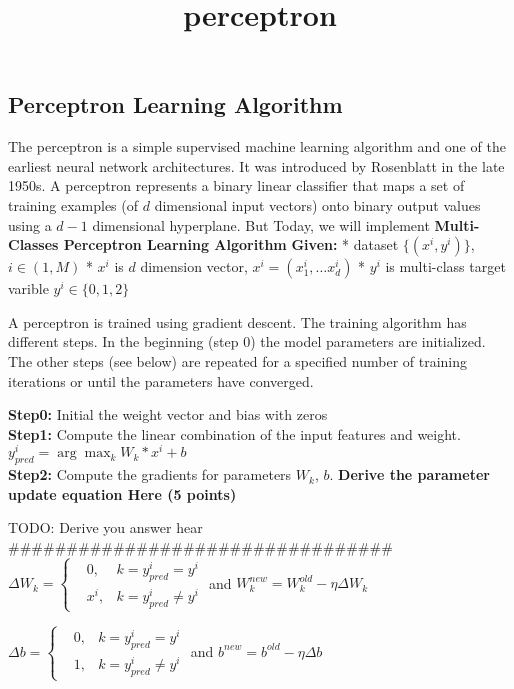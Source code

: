 \documentclass[11pt]{article}
\title{perceptron}
\begin{document}
    
    \maketitle
    
    

    
    \hypertarget{perceptron-learning-algorithm}{%
\subsection{Perceptron Learning
Algorithm}\label{perceptron-learning-algorithm}}

The perceptron is a simple supervised machine learning algorithm and one
of the earliest neural network architectures. It was introduced by
Rosenblatt in the late 1950s. A perceptron represents a binary linear
classifier that maps a set of training examples (of \(d\) dimensional
input vectors) onto binary output values using a \(d-1\) dimensional
hyperplane. But Today, we will implement \textbf{Multi-Classes
Perceptron Learning Algorithm} \textbf{Given:} * dataset
\(\{(x^i, y^i)\}\), \(i \in (1, M)\) * \(x^i\) is \(d\) dimension
vector, \(x^i = (x^i_1, \dots x^i_d)\) * \(y^i\) is multi-class target
varible \(y^i \in \{0,1,2\}\)

A perceptron is trained using gradient descent. The training algorithm
has different steps. In the beginning (step 0) the model parameters are
initialized. The other steps (see below) are repeated for a specified
number of training iterations or until the parameters have converged.

\textbf{Step0:} Initial the weight vector and bias with zeros\\
\textbf{Step1:} Compute the linear combination of the input features and
weight. \(y^i_{pred} = \arg\max_k W_k*x^i + b\)\\
\textbf{Step2:} Compute the gradients for parameters \(W_k\), \(b\).
\textbf{Derive the parameter update equation Here (5 points)}

TODO: Derive you answer hear
\#\#\#\#\#\#\#\#\#\#\#\#\#\#\#\#\#\#\#\#\#\#\#\#\#\#\#\#\#\#\#\#\#
\(\Delta W_k = \left\{  \begin{aligned}  & 0, & k = y^i_{pred} = y^i \\  & x^i, & k = y^i_{pred} \neq y^i  \end{aligned} \right.\)
and \(W_k^{new} = W_k^{old} - \eta\Delta W_k\)

\(\Delta b = \left\{  \begin{aligned}  & 0, & k = y^i_{pred} = y^i \\  & 1, & k = y^i_{pred} \neq y^i  \end{aligned} \right.\)
and \(b^{new} = b^{old} - \eta\Delta b\)
\end{document}
